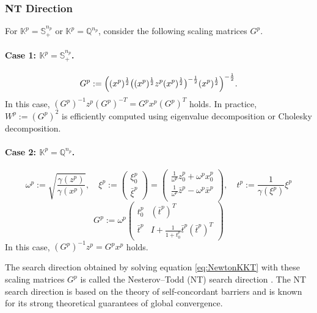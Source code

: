 \documentclass{scrartcl}
\begin{document}
\subsubsection{NT Direction}

For $\mathbb{K}^p = \mathbb{S}^{n_p}_+$ or $\mathbb{K}^p = \mathbb{Q}^{n_p}$, consider the following scaling matrices $G^p$.

\paragraph{Case 1: \(\mathbb{K}^p = \mathbb{S}^{n_p}_+\).}
\[
  G^p 
  := 
    \Bigl( (x^p)^{\frac12} \bigl( (x^p)^{\frac12} z^p (x^p)^{\frac12} \bigr)^{-\frac12} (x^p)^{\frac12} \Bigr)^{-\frac12}.
\]
In this case, $(G^p)^{-1} z^p (G^p)^{-T} = G^p x^p (G^p)^T$ holds. In practice, $W^p := (G^p)^2$ is efficiently computed using eigenvalue decomposition or Cholesky decomposition.

\paragraph{Case 2: \(\mathbb{K}^p = \mathbb{Q}^{n_p}\).}
\begin{equation}
    \omega^p := \sqrt{\frac{\gamma(z^p)}{\gamma(x^p)}}, 
    \quad 
    \xi^p 
    := \begin{pmatrix} \xi^p_0 \\ \bar{\xi}^p \end{pmatrix} 
    = \begin{pmatrix}
        \frac{1}{\omega^p} z^p_0 + \omega^p x^p_0 \\
        \frac{1}{\omega^p} \bar{z}^p - \omega^p \bar{x}^p \\
    \end{pmatrix},
    \quad
    t^p := \frac{1}{\gamma(\xi^p)}\xi^p
    \label{eq:scaling_mat_NT_socp_aux}
\end{equation}
\begin{equation}
    G^p := \omega^p \begin{pmatrix}
        t^p_0 & (\bar{t}^p)^T \\
        \bar{t}^p & I+\frac{1}{1 + t^p_0} \bar{t}^p(\bar{t}^p)^T
    \end{pmatrix}
    \label{eq:scaling_mat_NT_socp}
\end{equation}
In this case, $(G^p)^{-1} z^p = G^p x^p$ holds.

\medskip

The search direction obtained by solving equation \eqref{eq:NewtonKKT} with these scaling matrices $G^p$ is called the Nesterov--Todd (NT) search direction \cite{Nesterov1997,todd1998}. The NT search direction is based on the theory of self-concordant barriers and is known for its strong theoretical guarantees of global convergence.
\end{document}
